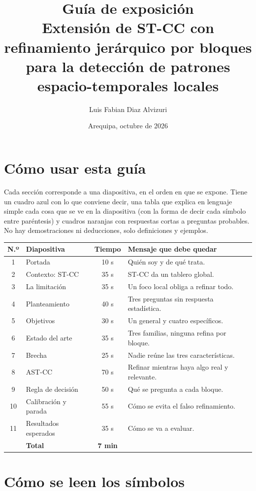 \documentclass[11pt,a4paper]{article}
\title{\textbf{Guía de exposición}\\[0.5ex]\large Extensión de ST-CC con refinamiento jerárquico por bloques\\para la detección de patrones espacio-temporales locales}
\author{Luis Fabian Diaz Alvizuri}
\date{Arequipa, octubre de 2026}
\begin{document}
\maketitle

\section*{Cómo usar esta guía}

Cada sección corresponde a una diapositiva, en el orden en que se expone. Tiene un cuadro azul con lo que conviene decir, una tabla que explica en lenguaje simple cada cosa que se ve en la diapositiva (con la forma de decir cada símbolo entre paréntesis) y cuadros naranjas con respuestas cortas a preguntas probables. No hay demostraciones ni deducciones, solo definiciones y ejemplos.

\begin{center}
\small
\begin{tabular}{@{}clcl@{}}
\toprule
N.º & Diapositiva & Tiempo & Mensaje que debe quedar \\
\midrule
1 & Portada & 10 s & Quién soy y de qué trata. \\
2 & Contexto: ST-CC & 35 s & ST-CC da un tablero global. \\
3 & La limitación & 35 s & Un foco local obliga a refinar todo. \\
4 & Planteamiento & 40 s & Tres preguntas sin respuesta estadística. \\
5 & Objetivos & 30 s & Un general y cuatro específicos. \\
6 & Estado del arte & 35 s & Tres familias, ninguna refina por bloque. \\
7 & Brecha & 25 s & Nadie reúne las tres características. \\
8 & AST-CC & 70 s & Refinar mientras haya algo real y relevante. \\
9 & Regla de decisión & 50 s & Qué se pregunta a cada bloque. \\
10 & Calibración y parada & 55 s & Cómo se evita el falso refinamiento. \\
11 & Resultados esperados & 35 s & Cómo se va a evaluar. \\
\midrule
 & \textbf{Total} & \textbf{7 min} & \\
\bottomrule
\end{tabular}
\end{center}

\section*{Cómo se leen los símbolos}
\end{document}
